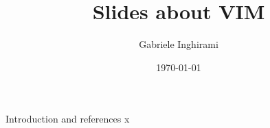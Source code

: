 

    
    \author[Gabriele Inghirami]{Gabriele Inghirami}
    \title[Slides about VIM]{Slides about VIM}
    \date{\today}
    \maketitle
    
    \begin{frame}{Introduction and references}
    x
    \end{frame}
     


